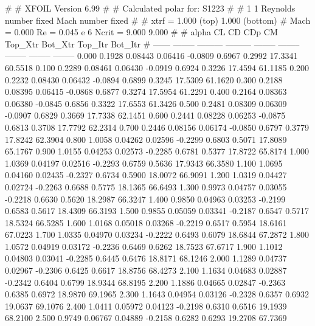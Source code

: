 #  
#       XFOIL         Version 6.99
#  
# Calculated polar for: S1223                                           
#  
# 1 1 Reynolds number fixed          Mach number fixed         
#  
# xtrf =   1.000 (top)        1.000 (bottom)  
# Mach =   0.000     Re =     0.045 e 6     Ncrit =   9.000  9.000
#  
#   alpha    CL        CD       CDp       CM     Top_Xtr  Bot_Xtr  Top_Itr  Bot_Itr
#  ------ -------- --------- --------- -------- -------- -------- -------- --------
   0.000   0.1928   0.08443   0.06416  -0.0809   0.6967   0.2992  17.3341  60.5518
   0.100   0.2289   0.08461   0.06430  -0.0919   0.6924   0.3226  17.4594  61.1185
   0.200   0.2232   0.08430   0.06432  -0.0894   0.6899   0.3245  17.5309  61.1620
   0.300   0.2188   0.08395   0.06415  -0.0868   0.6877   0.3274  17.5954  61.2291
   0.400   0.2164   0.08363   0.06380  -0.0845   0.6856   0.3322  17.6553  61.3426
   0.500   0.2481   0.08309   0.06309  -0.0907   0.6829   0.3669  17.7338  62.1451
   0.600   0.2441   0.08228   0.06253  -0.0875   0.6813   0.3708  17.7792  62.2314
   0.700   0.2446   0.08156   0.06174  -0.0850   0.6797   0.3779  17.8242  62.3904
   0.800   1.0058   0.04262   0.02596  -0.2299   0.6803   0.5071  17.8089  65.1767
   0.900   1.0155   0.04253   0.02573  -0.2285   0.6781   0.5377  17.8722  65.8174
   1.000   1.0369   0.04197   0.02516  -0.2293   0.6759   0.5636  17.9343  66.3580
   1.100   1.0695   0.04160   0.02435  -0.2327   0.6734   0.5900  18.0072  66.9091
   1.200   1.0319   0.04427   0.02724  -0.2263   0.6688   0.5775  18.1365  66.6493
   1.300   0.9973   0.04757   0.03055  -0.2218   0.6630   0.5620  18.2987  66.3247
   1.400   0.9850   0.04963   0.03253  -0.2199   0.6583   0.5617  18.4309  66.3193
   1.500   0.9855   0.05059   0.03341  -0.2187   0.6547   0.5717  18.5324  66.5285
   1.600   1.0168   0.05018   0.03268  -0.2219   0.6517   0.5954  18.6161  67.0223
   1.700   1.0335   0.04970   0.03234  -0.2222   0.6493   0.6079  18.6844  67.2872
   1.800   1.0572   0.04919   0.03172  -0.2236   0.6469   0.6262  18.7523  67.6717
   1.900   1.1012   0.04803   0.03041  -0.2285   0.6445   0.6476  18.8171  68.1246
   2.000   1.1289   0.04737   0.02967  -0.2306   0.6425   0.6617  18.8756  68.4273
   2.100   1.1634   0.04683   0.02887  -0.2342   0.6404   0.6799  18.9344  68.8195
   2.200   1.1886   0.04665   0.02847  -0.2363   0.6385   0.6972  18.9870  69.1965
   2.300   1.1643   0.04954   0.03126  -0.2328   0.6357   0.6932  19.0637  69.1076
   2.400   1.0411   0.05972   0.04123  -0.2198   0.6310   0.6516  19.1939  68.2100
   2.500   0.9749   0.06767   0.04889  -0.2158   0.6282   0.6293  19.2708  67.7369
